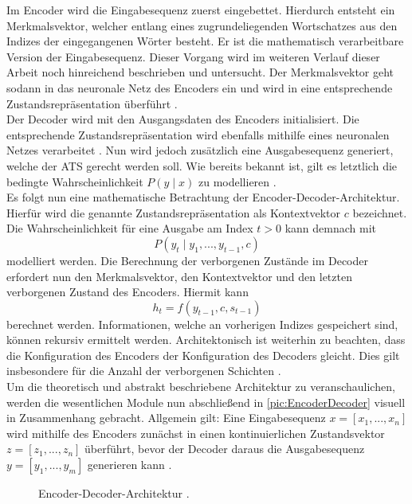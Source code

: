 \noindent
Im Encoder wird die Eingabesequenz zuerst eingebettet. Hierdurch entsteht ein Merkmalsvektor, welcher entlang eines zugrundeliegenden Wortschatzes aus den Indizes der eingegangenen Wörter besteht. Er ist die mathematisch verarbeitbare Version der Eingabesequenz. Dieser Vorgang wird im weiteren Verlauf dieser Arbeit noch hinreichend beschrieben und untersucht. Der Merkmalsvektor geht sodann in das neuronale Netz des Encoders ein und wird in eine entsprechende Zustandsrepräsentation überführt \cite{YAN19}.\\

\noindent
Der Decoder wird mit den Ausgangsdaten des Encoders initialisiert. Die entsprechende Zustandsrepräsentation wird ebenfalls mithilfe eines neuronalen Netzes verarbeitet \cite[S.379]{ZHA20}. Nun wird jedoch zusätzlich eine Ausgabesequenz generiert, welche der \ac{ATS} gerecht werden soll. Wie bereits bekannt ist, gilt es letztlich die bedingte Wahrscheinlichkeit $P(y \mid x)$ zu modellieren \cite{YAN19}.\\

\noindent
Es folgt nun eine mathematische Betrachtung der Encoder-Decoder-Architektur. Hierfür wird die genannte Zustandsrepräsentation als Kontextvektor $c$ bezeichnet. Die Wahrscheinlichkeit für eine Ausgabe am Index $t > 0$ kann demnach mit $$P(y_t \mid y_1, ..., y_{t-1}, c)$$ modelliert werden. Die Berechnung der verborgenen Zustände im Decoder erfordert nun den Merkmalsvektor, den Kontextvektor und den letzten verborgenen Zustand des Encoders. Hiermit kann $$h_t = f(y_{t-1}, c, s_{t-1})$$ berechnet werden. Informationen, welche an vorherigen Indizes gespeichert sind, können rekursiv ermittelt werden. Architektonisch ist weiterhin zu beachten, dass die Konfiguration des Encoders der Konfiguration des Decoders gleicht. Dies gilt insbesondere für die Anzahl der verborgenen Schichten \cite[S.~379]{ZHA20}.\\

\noindent
Um die theoretisch und abstrakt beschriebene Architektur zu veranschaulichen, werden die wesentlichen Module nun abschließend in \autoref{pic:EncoderDecoder} visuell in Zusammenhang gebracht. Allgemein gilt: Eine Eingabesequenz $x = [x_{1}, ..., x_{n}]$ wird mithilfe des Encoders zunächst in einen kontinuierlichen Zustandsvektor $z = [z_{1}, ..., z_{n}]$ überführt, bevor der Decoder daraus die Ausgabesequenz $y = [y_{1}, ..., y_{m}]$ generieren kann \cite{VAS17}.\\

\begin{figure}[h!]
  \centering
  \caption{Encoder-Decoder-Architektur \cite[S.~375]{ZHA20}.}
  \label{pic:EncoderDecoder}
\end{figure}


